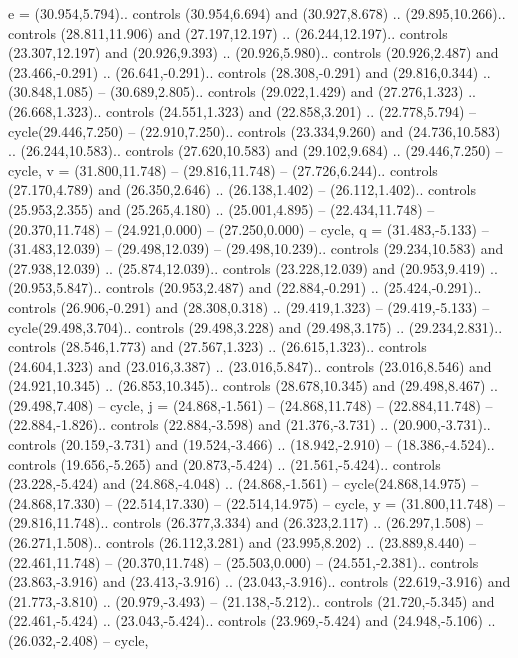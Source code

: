 {e} = {(30.954,5.794).. controls (30.954,6.694) and (30.927,8.678) .. (29.895,10.266).. controls (28.811,11.906) and (27.197,12.197) .. (26.244,12.197).. controls (23.307,12.197) and (20.926,9.393) .. (20.926,5.980).. controls (20.926,2.487) and (23.466,-0.291) .. (26.641,-0.291).. controls (28.308,-0.291) and (29.816,0.344) .. (30.848,1.085) -- (30.689,2.805).. controls (29.022,1.429) and (27.276,1.323) .. (26.668,1.323).. controls (24.551,1.323) and (22.858,3.201) .. (22.778,5.794) -- cycle(29.446,7.250) -- (22.910,7.250).. controls (23.334,9.260) and (24.736,10.583) .. (26.244,10.583).. controls (27.620,10.583) and (29.102,9.684) .. (29.446,7.250) -- cycle},
{v} = {(31.800,11.748) -- (29.816,11.748) -- (27.726,6.244).. controls (27.170,4.789) and (26.350,2.646) .. (26.138,1.402) -- (26.112,1.402).. controls (25.953,2.355) and (25.265,4.180) .. (25.001,4.895) -- (22.434,11.748) -- (20.370,11.748) -- (24.921,0.000) -- (27.250,0.000) -- cycle},
{q} = {(31.483,-5.133) -- (31.483,12.039) -- (29.498,12.039) -- (29.498,10.239).. controls (29.234,10.583) and (27.938,12.039) .. (25.874,12.039).. controls (23.228,12.039) and (20.953,9.419) .. (20.953,5.847).. controls (20.953,2.487) and (22.884,-0.291) .. (25.424,-0.291).. controls (26.906,-0.291) and (28.308,0.318) .. (29.419,1.323) -- (29.419,-5.133) -- cycle(29.498,3.704).. controls (29.498,3.228) and (29.498,3.175) .. (29.234,2.831).. controls (28.546,1.773) and (27.567,1.323) .. (26.615,1.323).. controls (24.604,1.323) and (23.016,3.387) .. (23.016,5.847).. controls (23.016,8.546) and (24.921,10.345) .. (26.853,10.345).. controls (28.678,10.345) and (29.498,8.467) .. (29.498,7.408) -- cycle},
{j} = {(24.868,-1.561) -- (24.868,11.748) -- (22.884,11.748) -- (22.884,-1.826).. controls (22.884,-3.598) and (21.376,-3.731) .. (20.900,-3.731).. controls (20.159,-3.731) and (19.524,-3.466) .. (18.942,-2.910) -- (18.386,-4.524).. controls (19.656,-5.265) and (20.873,-5.424) .. (21.561,-5.424).. controls (23.228,-5.424) and (24.868,-4.048) .. (24.868,-1.561) -- cycle(24.868,14.975) -- (24.868,17.330) -- (22.514,17.330) -- (22.514,14.975) -- cycle},
{y} = {(31.800,11.748) -- (29.816,11.748).. controls (26.377,3.334) and (26.323,2.117) .. (26.297,1.508) -- (26.271,1.508).. controls (26.112,3.281) and (23.995,8.202) .. (23.889,8.440) -- (22.461,11.748) -- (20.370,11.748) -- (25.503,0.000) -- (24.551,-2.381).. controls (23.863,-3.916) and (23.413,-3.916) .. (23.043,-3.916).. controls (22.619,-3.916) and (21.773,-3.810) .. (20.979,-3.493) -- (21.138,-5.212).. controls (21.720,-5.345) and (22.461,-5.424) .. (23.043,-5.424).. controls (23.969,-5.424) and (24.948,-5.106) .. (26.032,-2.408) -- cycle},
